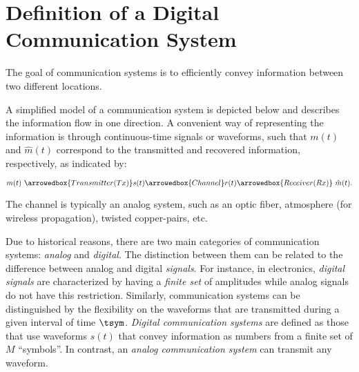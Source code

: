 \section{Definition of a Digital Communication System}


The goal of communication systems is to efficiently convey information between two different locations.

A simplified model of a communication system is depicted below and describes the information  flow in one direction.
A convenient way of representing the information is through continuous-time signals or waveforms, such that $m(t)$ and $\hat m(t)$ correspond to the transmitted and recovered information, respectively, as indicated by:
{\small\[m(t) \textrm{~} \arrowedbox{Transmitter (Tx)} s(t) \arrowedbox{Channel} r(t)  \arrowedbox{Receiver (Rx)}  \textrm{~}\hat{m}(t).\]\par}
The channel is typically an analog system, such as an optic fiber, atmosphere (for wireless propagation), twisted copper-pairs, etc.

Due to historical reasons, there are two main categories of communication systems: \emph{analog} and \emph{digital}.
The distinction between them can be related to the difference between analog and digital \emph{signals}.
For instance, in electronics, \emph{digital signals} are characterized by having a \emph{finite set} of amplitudes while analog signals do not have this restriction. Similarly, communication systems
can be distinguished by the flexibility on the waveforms that are transmitted during a given interval of time $\tsym$. 
\emph{Digital communication systems} are defined as those that use waveforms $s(t)$  that convey information as numbers from a finite set of $M$ ``symbols''.
In contrast, an \emph{analog communication system} can transmit any waveform.

